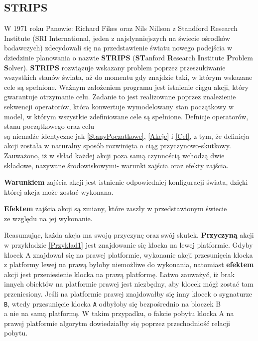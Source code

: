     \subsection{STRIPS}
    \label{STRIPSRozdział}
    W 1971 roku Panowie: Richard Fikes oraz Nils Nillson z Standford Research Institute (SRI International, 
    jeden z najsłynniejszych na świecie ośrodków badawczych) zdecydowali się na przedstawienie światu
    nowego podejścia w dziedzinie planowania o nazwie \textbf{STRIPS} (\textbf{ST}anford \textbf{R}esearch \textbf{I}nstitute
    \textbf{P}roblem \textbf{S}olver)\cite{STRIPS}.
    \textbf{STRIPS} rozwiązuje wskazany problem poprzez przeszukiwanie wszystkich stanów świata, aż do momentu
    gdy znajdzie taki, w którym wskazane cele są spełnione. Ważnym założeniem programu jest istnienie
    ciągu akcji, który gwarantuje otrzymanie celu. Zadanie to jest realizowane poprzez znalezienie
    sekwencji operatorów, która konwertuje wymodelowany stan początkowy w model, w którym wszystkie 
    zdefiniowane cele są spełnione. Defnicje operatorów, stanu początkowego oraz celu\\
     są niemalże identyczne jak 
    \ref{StanyPoczatkowe}, \ref{Akcje} i \ref{Cel}, z tym, że definicja akcji została w naturalny sposób rozwinięta o ciąg przyczynowo-skutkowy. Zauważono, iż w skład każdej akcji 
    poza samą czynnością wchodzą dwie składowe, nazywane środowiskowymi- warunki zajścia oraz efekty zajścia. 
    \begin{definition}
        \label{WarunekAkcji}
        \textbf{Warunkiem} zajścia akcji jest istnienie odpowiedniej konfiguracji świata, dzięki której akcja może zostać wykonana.
    \end{definition}
    \begin{definition}
        \label{EfektAkcji}
        \textbf{Efektem} zajścia akcji są zmiany, które zaszły w przedstawionym świecie \\
        ze względu na jej wykonanie.
    \end{definition}
    Reasumując, każda akcja ma swoją przyczynę oraz swój skutek. \textbf{Przyczyną} akcji w przykładzie \ref{Przyklad1} jest znajdowanie się klocka na lewej platformie. Gdyby
    klocek A znajdował się na prawej platformie, wykonanie akcji przesunięcia klocka z platformy lewej na prawą byłoby niemożliwe do wykonania, natomiast \textbf{efektem} akcji jest 
    przeniesienie klocka na prawą platformę. Łatwo zauważyć, iż brak innych obiektów na platformie prawej jest niezbędny, aby klocek mógł zostać tam przeniesiony.
    Jeśli na platformie prawej znajdowałby się inny klocek o sygnaturze \texttt{B}, wtedy przesunięcie klocka \texttt{A} odbyłoby się bezpośrednio na 
    bloczek B \\ 
    a nie na samą platformę. W takim przypadku, o fakcie pobytu klocka A na prawej platformie algorytm dowiedziałby się poprzez przechodniość 
    relacji pobytu.

